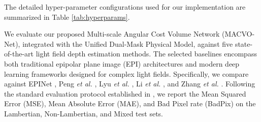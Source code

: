 \documentclass[lettersize,journal]{IEEEtran}
\begin{document}
The detailed hyper-parameter configurations used for our implementation are summarized in Table \ref{tab:hyperparams}.

\begin{table}[htbp]
  \centering
  \caption{Summary of Key Hyper-parameters for Implementation.}
  \label{tab:hyperparams}
\end{table}

We evaluate our proposed Multi-scale Angular Cost Volume Network (MACVO-Net), integrated with the Unified Dual-Mask Physical Model, against five state-of-the-art light field depth estimation methods. The selected baselines encompass both traditional epipolar plane image (EPI) architectures and modern deep learning frameworks designed for complex light fields. Specifically, we compare against EPINet \cite{heber2018}, Peng \textit{et al.} \cite{peng2022}, Lyu \textit{et al.} \cite{lyu2022}, Li \textit{et al.} \cite{li2021}, and Zhang \textit{et al.} \cite{zhang2023}. Following the standard evaluation protocol established in \cite{honauer2016}, we report the Mean Squared Error (MSE), Mean Absolute Error (MAE), and Bad Pixel rate (BadPix) on the Lambertian, Non-Lambertian, and Mixed test sets.
\end{document}

